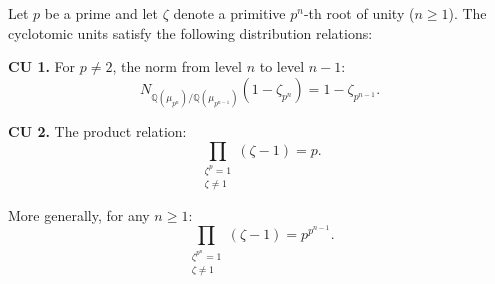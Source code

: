 Let $p$ be a prime and let $\zeta$ denote a primitive $p^n$-th root of unity ($n \geq 1$). The cyclotomic units satisfy the following distribution relations:

\textbf{CU 1.} For $p \neq 2$, the norm from level $n$ to level $n-1$:
$$
N_{\mathbb{Q}(\mu_{p^n})/\mathbb{Q}(\mu_{p^{n-1}})}(1 - \zeta_{p^n}) = 1 - \zeta_{p^{n-1}}.
$$

\textbf{CU 2.} The product relation:
$$
\prod_{\substack{\zeta^{p}=1 \\ \zeta \neq 1}} (\zeta - 1) = p.
$$

More generally, for any $n \geq 1$:
$$
\prod_{\substack{\zeta^{p^n}=1 \\ \zeta \neq 1}} (\zeta - 1) = p^{p^{n-1}}.
$$
